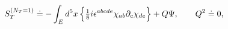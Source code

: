 \begin{equation}
\label{2.6}
S_T^{(N_T = 1)} \doteq - \int_E d^5x\, \Bigr\{
\hbox{$\frac{1}{8}$} i \epsilon^{abcde} \chi_{ab} \partial_c \chi_{de}
\Bigr\} + Q \Psi,
\qquad
Q^2 \doteq 0,
\end{equation}


